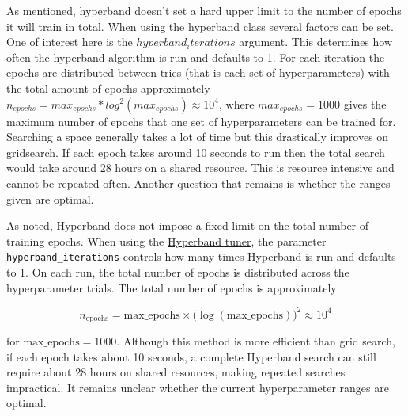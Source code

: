 As mentioned, hyperband doesn't set a hard upper limit to the number of epochs it will train in total. When using the \href{https://keras.io/api/keras_tuner/tuners/hyperband/}{hyperband class} several factors can be set. One of interest here is the $hyperband_iterations$ argument. This determines how often the hyperband algorithm is run and defaults to 1. For each iteration the epochs are distributed between tries (that is each set of hyperparameters) with the total amount of epochs approximately $n_{epochs} = max_{epochs} * log^2(max_{epochs})\approx 10^4$, where $max_{epochs} = 1000$ gives the maximum number of epochs that one set of hyperparameters can be trained for. Searching a space generally takes a lot of time but this drastically improves on gridsearch. If each epoch takes around 10 seconds to run then the total search would take around 28 hours on a shared resource. This is resource intensive and cannot be repeated often. Another question that remains is whether the ranges given are optimal.

As noted, Hyperband does not impose a fixed limit on the total number of training epochs. When using the \href{https://keras.io/api/keras_tuner/tuners/hyperband/}{Hyperband tuner}, the parameter \texttt{hyperband\_iterations} controls how many times Hyperband is run and defaults to 1. On each run, the total number of epochs is distributed across the hyperparameter trials. The total number of epochs is approximately

\begin{equation*}
n_{\mathrm{epochs}} = \text{max\_epochs} \times \bigl(\log(\text{max\_epochs})\bigr)^2 \approx 10^4
\end{equation*}

for $ \text{max\_epochs} = 1000$. Although this method is more efficient than grid search, if each epoch takes about 10 seconds, a complete Hyperband search can still require about 28 hours on shared resources, making repeated searches impractical. It remains unclear whether the current hyperparameter ranges are optimal.
